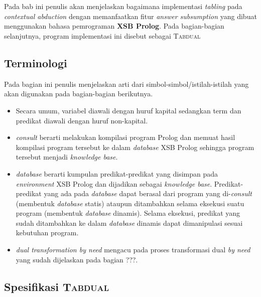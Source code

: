 \chapter{\babTiga}
Pada bab ini penulis akan menjelaskan bagaimana implementasi \textit{tabling} pada \textit{contextual abduction} dengan memanfaatkan fitur \textit{answer subsumption} yang dibuat menggunakan bahasa pemrograman \textbf{XSB Prolog}. Pada bagian-bagian selanjutnya, program implementasi ini disebut sebagai \textsc{Tabdual}

\section{Terminologi}

Pada bagian ini penulis menjelaskan arti dari simbol-simbol/istilah-istilah yang akan digunakan pada bagian-bagian berikutnya. 

\begin{itemize}
	\item Secara umum, variabel diawali dengan huruf kapital sedangkan term dan predikat diawali dengan huruf non-kapital.
	\item \textit{consult} berarti melakukan kompilasi program Prolog dan memuat hasil kompilasi program tersebut ke dalam \textit{database} XSB Prolog sehingga program tersebut menjadi \textit{knowledge base}.
	\item \textit{database} berarti kumpulan predikat-predikat yang disimpan pada \textit{environment} XSB Prolog dan dijadikan sebagai \textit{knowledge base}. Predikat-predikat yang ada pada \textit{database} dapat berasal dari program yang di-\textit{consult} (membentuk \textit{database} statis) ataupun ditambahkan selama eksekusi suatu program (membentuk \textit{database} dinamis). Selama eksekusi, predikat yang sudah ditambahkan ke dalam \textit{database} dinamis dapat dimanipulasi sesuai kebutuhan program.
	\item \textit{dual transformation by need} mengacu pada proses transformasi dual \textit{by need} yang sudah dijelaskan pada bagian ???.
\end{itemize}

\section{Spesifikasi \textsc{Tabdual}}

